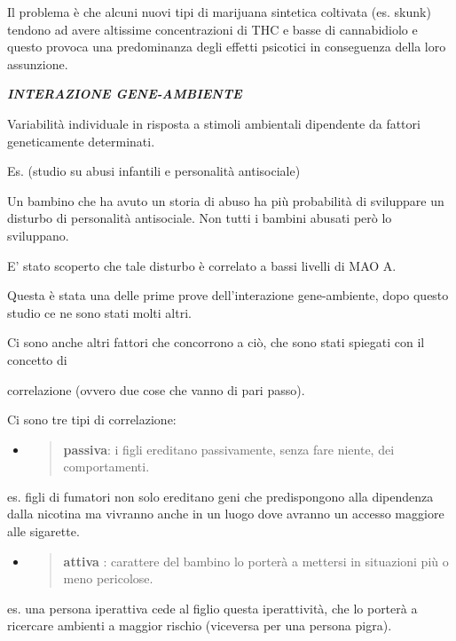 \documentclass[]{article}
\begin{document}
Il problema è che alcuni nuovi tipi di marijuana sintetica coltivata
(es. skunk) tendono ad avere altissime concentrazioni di THC e basse di
cannabidiolo e questo provoca una predominanza degli effetti psicotici
in conseguenza della loro assunzione.

\textbf{\emph{INTERAZIONE GENE-AMBIENTE}}

Variabilità individuale in risposta a stimoli ambientali dipendente da
fattori geneticamente determinati.

Es. (studio su abusi infantili e personalità antisociale)

Un bambino che ha avuto un storia di abuso ha più probabilità di
sviluppare un disturbo di personalità antisociale. Non tutti i bambini
abusati però lo sviluppano.

E' stato scoperto che tale disturbo è correlato a bassi livelli di MAO
A.

Questa è stata una delle prime prove dell'interazione gene-ambiente,
dopo questo studio ce ne sono stati molti altri.

Ci sono anche altri fattori che concorrono a ciò, che sono stati
spiegati con il concetto di

correlazione (ovvero due cose che vanno di pari passo).

Ci sono tre tipi di correlazione:

\begin{itemize}
\item
  \begin{quote}
  \textbf{passiva}: i figli ereditano passivamente, senza fare niente,
  dei comportamenti.
  \end{quote}
\end{itemize}

es. figli di fumatori non solo ereditano geni che predispongono alla
dipendenza dalla nicotina ma vivranno anche in un luogo dove avranno un
accesso maggiore alle sigarette.

\begin{itemize}
\item
  \begin{quote}
  \textbf{attiva} : carattere del bambino lo porterà a mettersi in
  situazioni più o meno pericolose.
  \end{quote}
\end{itemize}

es. una persona iperattiva cede al figlio questa iperattività, che lo
porterà a ricercare ambienti a maggior rischio (viceversa per una
persona pigra).
\end{document}
